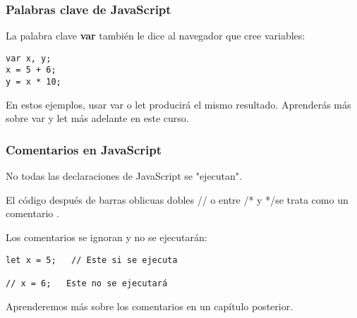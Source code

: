 \begin{frame}[fragile]
  \frametitle{Palabras clave de JavaScript}

  La palabra clave \textbf{var} también le dice
  al navegador que cree variables:

  \vspace{\baselineskip}
  \begin{lstlisting}
var x, y;
x = 5 + 6;
y = x * 10;
  \end{lstlisting}

  \begin{block}{}
  En estos ejemplos, usar var o let producirá el mismo resultado.
  Aprenderás más sobre var y let más adelante en este curso.
  \end{block}
\end{frame}

\begin{frame}[fragile]
  \frametitle{Comentarios en JavaScript}

  No todas las declaraciones de JavaScript se "ejecutan".

  \vspace{\baselineskip}
  El código después de barras oblicuas dobles // o entre
  /* y */se trata como un comentario .

  \vspace{\baselineskip}
  Los comentarios se ignoran y no se ejecutarán:

  \vspace{\baselineskip}
  \begin{lstlisting}
let x = 5;   // Este si se ejecuta

// x = 6;   Este no se ejecutará
  \end{lstlisting}

  \begin{block}{}
  Aprenderemos más sobre los comentarios en un capítulo posterior.
  \end{block}
\end{frame}

